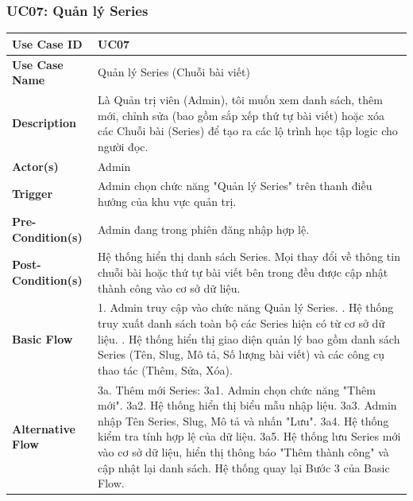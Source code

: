 \documentclass[a4paper,12pt]{article}
\begin{document}
\subsubsection{UC07: Quản lý Series}
\begin{longtable}{|p{4cm}|p{11.5cm}|}
\hline
\textbf{Use Case ID} & UC07 \\ \hline
\textbf{Use Case Name} & Quản lý Series (Chuỗi bài viết) \\ \hline
\textbf{Description} & Là Quản trị viên (Admin), tôi muốn xem danh sách, thêm mới, chỉnh sửa (bao gồm sắp xếp thứ tự bài viết) hoặc xóa các Chuỗi bài (Series) để tạo ra các lộ trình học tập logic cho người đọc. \\ \hline
\textbf{Actor(s)} & Admin \\ \hline
\textbf{Trigger} & Admin chọn chức năng "Quản lý Series" trên thanh điều hướng của khu vực quản trị. \\ \hline
\textbf{Pre-Condition(s)} & Admin đang trong phiên đăng nhập hợp lệ. \\ \hline
\textbf{Post-Condition(s)} & Hệ thống hiển thị danh sách Series. Mọi thay đổi về thông tin chuỗi bài hoặc thứ tự bài viết bên trong đều được cập nhật thành công vào cơ sở dữ liệu. \\ \hline
\textbf{Basic Flow} & 
1. Admin truy cập vào chức năng Quản lý Series. \newline
2. Hệ thống truy xuất danh sách toàn bộ các Series hiện có từ cơ sở dữ liệu. \newline
3. Hệ thống hiển thị giao diện quản lý bao gồm danh sách Series (Tên, Slug, Mô tả, Số lượng bài viết) và các công cụ thao tác (Thêm, Sửa, Xóa). \\ \hline
\textbf{Alternative Flow} & 
3a. Thêm mới Series: \newline
3a1. Admin chọn chức năng "Thêm mới". \newline
3a2. Hệ thống hiển thị biểu mẫu nhập liệu. \newline
3a3. Admin nhập Tên Series, Slug, Mô tả và nhấn "Lưu". \newline
3a4. Hệ thống kiểm tra tính hợp lệ của dữ liệu. \newline
3a5. Hệ thống lưu Series mới vào cơ sở dữ liệu, hiển thị thông báo "Thêm thành công" và cập nhật lại danh sách. \newline
Hệ thống quay lại Bước 3 của Basic Flow. \newline


\end{longtable}
\end{document}
